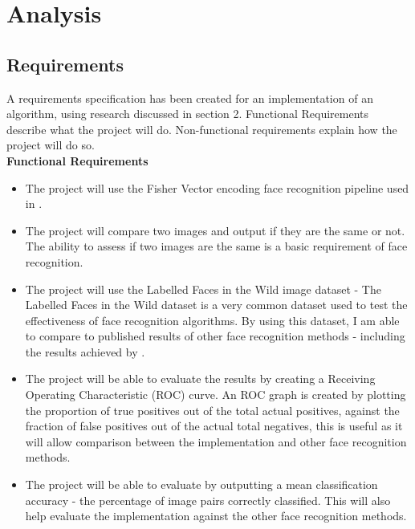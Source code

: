 \documentclass[12pt, a4paper]{article}
\begin{document}
\newpage
\section{Analysis}
\subsection{Requirements}
A requirements specification has been created for an implementation of an algorithm, using research discussed in section 2. Functional Requirements describe what the project will do. Non-functional requirements explain how the project will do so. \\

\textbf{Functional Requirements}
\begin{itemize}
\item The project will use the Fisher Vector encoding face recognition pipeline used in \cite{simonyan2004fisher}.
\item The project will compare two images and output if they are the same or not. The ability to assess if two images are the same is a basic requirement of face recognition.
\item The project will use the Labelled Faces in the Wild image dataset - The Labelled Faces in the Wild dataset is a very common dataset used to test the effectiveness of face recognition algorithms. By using this dataset, I am able to compare to published results of other face recognition methods - including the results achieved by \cite{simonyan2004fisher}.
\item The project will be able to evaluate the results by creating a Receiving Operating Characteristic (ROC) curve. An ROC graph is created by plotting the proportion of true positives out of the total actual positives, against the fraction of false positives out of the actual total negatives, this is useful as it will allow comparison between the implementation and other face recognition methods.
\item The project will be able to evaluate by outputting a mean classification accuracy - the percentage of image pairs correctly classified. This will also help evaluate the implementation against the other face recognition methods.
\end{itemize}
\end{document}
